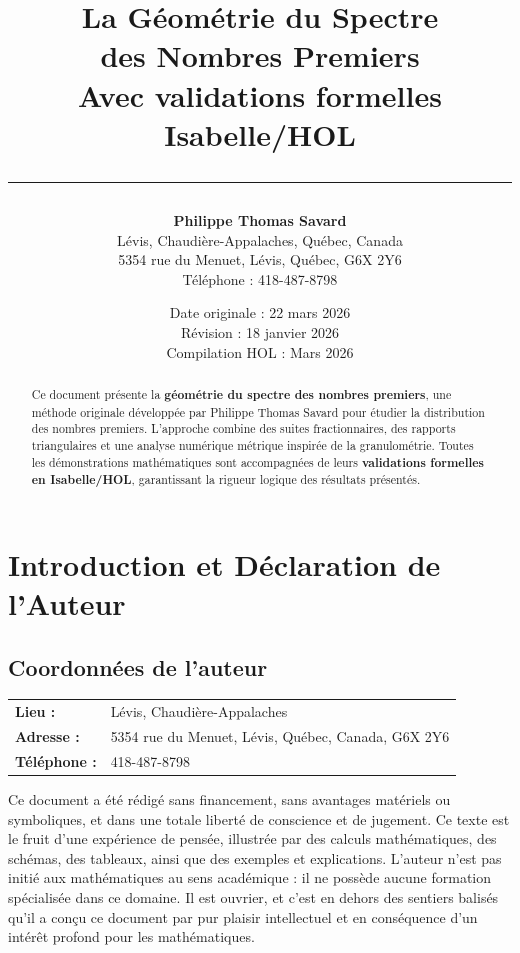 \documentclass[a4paper,11pt]{article}
\title{
    \vspace{-2cm}
    {\LARGE \textbf{La Géométrie du Spectre}}\\[0.5cm]
    {\LARGE \textbf{des Nombres Premiers}}\\[1cm]
    {\large Avec validations formelles Isabelle/HOL}\\[0.5cm]
    \rule{\textwidth}{0.4pt}
}
\author{
    \textbf{Philippe Thomas Savard}\\[0.3cm]
    \small Lévis, Chaudière-Appalaches, Québec, Canada\\
    \small 5354 rue du Menuet, Lévis, Québec, G6X 2Y6\\
    \small Téléphone : 418-487-8798
}
\date{
    \vspace{0.5cm}
    Date originale : 22 mars 2026\\
    Révision : 18 janvier 2026\\
    Compilation HOL : Mars 2026
}
\begin{document}
\maketitle
\thispagestyle{empty}

\vspace{1cm}

\begin{abstract}
Ce document présente la \textbf{géométrie du spectre des nombres premiers}, une méthode originale développée par Philippe Thomas Savard pour étudier la distribution des nombres premiers. L'approche combine des suites fractionnaires, des rapports triangulaires et une analyse numérique métrique inspirée de la granulométrie. Toutes les démonstrations mathématiques sont accompagnées de leurs \textbf{validations formelles en Isabelle/HOL}, garantissant la rigueur logique des résultats présentés.
\end{abstract}

\newpage
\tableofcontents
\newpage

\section{Introduction et Déclaration de l'Auteur}

\subsection{Coordonnées de l'auteur}

\begin{center}
\begin{tabular}{ll}
\textbf{Lieu :} & Lévis, Chaudière-Appalaches \\
\textbf{Adresse :} & 5354 rue du Menuet, Lévis, Québec, Canada, G6X 2Y6 \\
\textbf{Téléphone :} & 418-487-8798 \\
\end{tabular}
\end{center}

\vspace{0.5cm}

Ce document a été rédigé sans financement, sans avantages matériels ou symboliques, et dans une totale liberté de conscience et de jugement. Ce texte est le fruit d'une expérience de pensée, illustrée par des calculs mathématiques, des schémas, des tableaux, ainsi que des exemples et explications. L'auteur n'est pas initié aux mathématiques au sens académique : il ne possède aucune formation spécialisée dans ce domaine. Il est ouvrier, et c'est en dehors des sentiers balisés qu'il a conçu ce document par pur plaisir intellectuel et en conséquence d'un intérêt profond pour les mathématiques.
\end{document}

